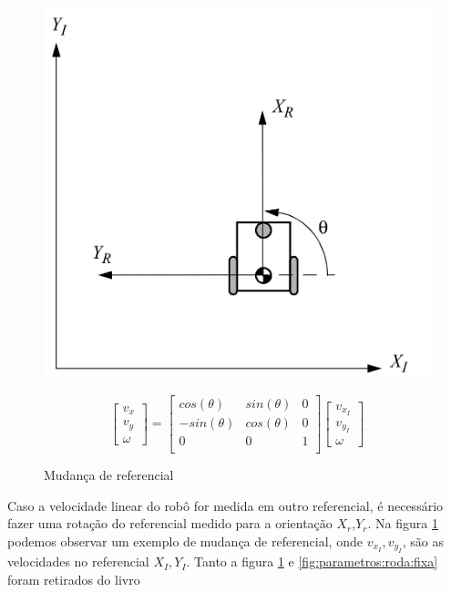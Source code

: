 \begin{figure}[H]
    \centering
    \includegraphics[scale=0.28]{figuras/robo_coordenadas.png}
   
    \[
    \begin{bmatrix}
        v_x \\
        v_y \\
        \omega
    \end{bmatrix}
    =
    \begin{bmatrix}
        cos(\theta)  & sin(\theta) & 0 \\
        -sin(\theta) & cos(\theta) & 0 \\
        0 & 0 & 1 \\
    \end{bmatrix}
    \begin{bmatrix}
        v_{x_I} \\
        v_{y_I} \\
        \omega
    \end{bmatrix}
\]
\caption{Mudança de referencial}
\label{fig:mudanca:referencial}
\end{figure}



Caso a velocidade linear do robô for medida em outro
referencial, é necessário fazer uma rotação do referencial
medido para a orientação $X_r$,$Y_r$. Na figura \ref{fig:mudanca:referencial}
podemos observar um exemplo de mudança de referencial,
onde $v_{x_I}, v_{y_I}$, são as velocidades no referencial $X_I,Y_I$.
Tanto a figura \ref{fig:mudanca:referencial} e \ref{fig:parametros:roda:fixa}
foram retirados do livro \cite{siegwart2011introduction}

